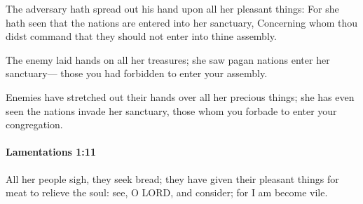 			\begin{versebox}
					\item[BHS] 
					\item[LXX] 
					\item[ASV] The adversary hath spread out his hand upon all her pleasant things: For she hath seen that the nations are entered into her sanctuary, Concerning whom thou didst command that they should not enter into thine assembly.
					\item[NIV] The enemy laid hands on all her treasures; she saw pagan nations enter her sanctuary— those you had forbidden to enter your assembly.
					\item[NRSV] Enemies have stretched out their hands over all her precious things; she has even seen the nations invade her sanctuary, those whom you forbade to enter your congregation.
			\end{versebox}

		\paragraph{Lamentations 1:11} %
			\label{LAMENTATIONS-1-11}

			All her people sigh, they seek bread; they have given their pleasant things for meat to relieve the soul: see, O LORD, and consider; for I am become vile.

